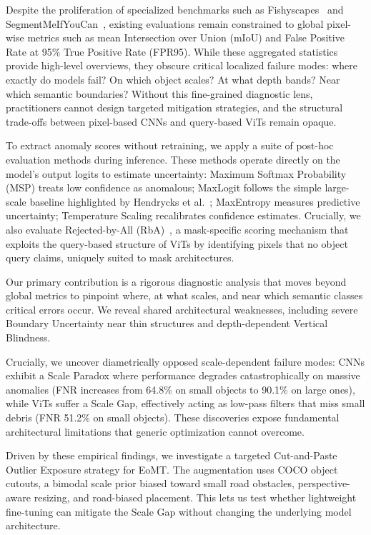 Despite the proliferation of specialized benchmarks such as Fishyscapes~\cite{blum2019fishyscapes} and SegmentMeIfYouCan~\cite{chan2021segmentmeifyoucan}, existing evaluations remain constrained to global pixel-wise metrics such as mean Intersection over Union (mIoU) and False Positive Rate at 95\% True Positive Rate (FPR95). While these aggregated statistics provide high-level overviews, they obscure critical localized failure modes: where exactly do models fail? On which object scales? At what depth bands? Near which semantic boundaries? Without this fine-grained diagnostic lens, practitioners cannot design targeted mitigation strategies, and the structural trade-offs between pixel-based CNNs and query-based ViTs remain opaque.

To extract anomaly scores without retraining, we apply a suite of post-hoc evaluation methods during inference. These methods operate directly on the model's output logits to estimate uncertainty: Maximum Softmax Probability (MSP) treats low confidence as anomalous; MaxLogit follows the simple large-scale baseline highlighted by Hendrycks et al.~\cite{hendrycks2022scaling}; MaxEntropy measures predictive uncertainty; Temperature Scaling recalibrates confidence estimates. Crucially, we also evaluate Rejected-by-All (RbA)~\cite{nayal2023rba}, a mask-specific scoring mechanism that exploits the query-based structure of ViTs by identifying pixels that no object query claims, uniquely suited to mask architectures.

Our primary contribution is a rigorous diagnostic analysis that moves beyond global metrics to pinpoint where, at what scales, and near which semantic classes critical errors occur. We reveal shared architectural weaknesses, including severe Boundary Uncertainty near thin structures and depth-dependent Vertical Blindness.

Crucially, we uncover diametrically opposed scale-dependent failure modes: CNNs exhibit a Scale Paradox where performance degrades catastrophically on massive anomalies (FNR increases from 64.8\% on small objects to 90.1\% on large ones), while ViTs suffer a Scale Gap, effectively acting as low-pass filters that miss small debris (FNR 51.2\% on small objects). These discoveries expose fundamental architectural limitations that generic optimization cannot overcome.

Driven by these empirical findings, we investigate a targeted Cut-and-Paste Outlier Exposure strategy for EoMT. The augmentation uses COCO object cutouts, a bimodal scale prior biased toward small road obstacles, perspective-aware resizing, and road-biased placement. This lets us test whether lightweight fine-tuning can mitigate the Scale Gap without changing the underlying model architecture.

